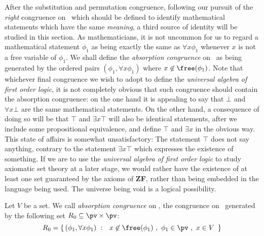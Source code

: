 After the substitution and permutation congruence, following our
pursuit of the {\em right} congruence on \pv\ which should be
defined to identify mathematical statements which have the same {\em
meaning}, a third source of identity will be studied in this
section. As mathematicians, it is not uncommon for us to regard a
mathematical statement $\phi_{1}$ as being exactly the same as
$\forall x\phi_{1}$ whenever $x$ is not a free variable of
$\phi_{1}$. We shall define the {\em absorption congruence} on \pv\
as being generated by the ordered pairs $(\phi_{1},\forall
x\phi_{1})$ where $x\not\in\free(\phi_{1})$. Note that whichever
final congruence we wish to adopt to define the {\em universal
algebra of first order logic}, it is not completely obvious that
such congruence should contain the absorption congruence: on the one
hand it is appealing to say that $\bot$ and $\forall x\bot$ are the
same mathematical statements. On the other hand, a consequence of
doing so will be that $\top$ and $\exists x\top$ will also be
identical statements, after we include some propositional
equivalence, and define $\top$ and $\exists x$ in the obvious way.
This state of affairs is somewhat unsatisfactory: The statement
$\top$ does not say anything, contrary to the statement $\exists
x\top$ which expresses the existence of something. If we are to use
the {\em universal algebra of first order logic} to study axiomatic
set theory at a later stage, we would rather have the existence of
at least one set guaranteed by the axioms of {\bf ZF}, rather than
being embedded in the language being used. The universe being void
is a logical possibility.
\begin{defin}\label{logic:def:FOPL:abscong:absorption}
Let $V$ be a set. We call {\em absorption congruence} on \pv, the
congruence on \pv\ generated by the following set $R_{0}\subseteq
\pv\times\pv$:
    \[
    R_{0}=\left\{\,(\phi_{1},\forall x\phi_{1})\ :\ \
    x\not\in\free(\phi_{1})\ ,\ \phi_{1}\in\pv\ ,\ x\in V\
    \,\right\}
    \]
\end{defin}

